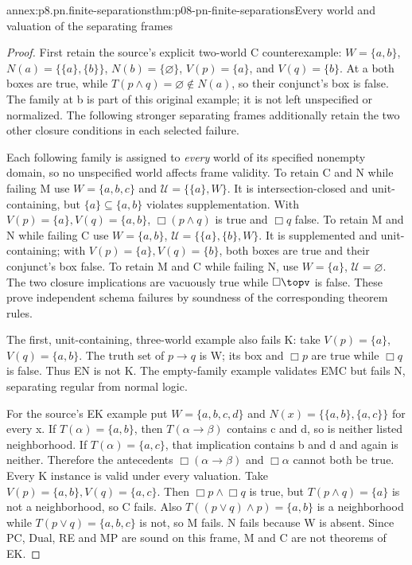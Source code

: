 \begin{annexitem}{annex:p8.pn.finite-separations}{thm:p08-pn-finite-separations}{Every world and valuation of the separating frames}
\begin{proof}
First retain the source's explicit two-world C counterexample:
\(W=\{a,b\}\), \(N(a)=\{\{a\},\{b\}\}\),
\(N(b)=\{\varnothing\}\), \(V(p)=\{a\}\), and
\(V(q)=\{b\}\). At a both boxes are true, while
\(T(p\land q)=\varnothing\notin N(a)\), so their
conjunct's box is false. The family at b is part of this
original example; it is not left unspecified or normalized.
The following stronger separating frames additionally retain
the two other closure conditions in each selected failure.

Each following family is assigned to \emph{every} world of its
specified nonempty domain, so no unspecified world affects frame
validity. To retain C and N while failing M use
\(W=\{a,b,c\}\) and \(\mathcal U=\{\{a\},W\}\).
It is intersection-closed and unit-containing, but
\(\{a\}\subseteq\{a,b\}\) violates supplementation. With
\(V(p)=\{a\},V(q)=\{a,b\}\),
\(\Box(p\land q)\) is true and \(\Box q\) false.
To retain M and N while failing C use
\(W=\{a,b\}\), \(\mathcal U=\{\{a\},\{b\},W\}\).
It is supplemented and unit-containing; with
\(V(p)=\{a\},V(q)=\{b\}\), both boxes are true and
their conjunct's box false. To retain M and C while failing N,
use \(W=\{a\}\), \(\mathcal U=\varnothing\).
The two closure implications are vacuously true while
\(\Box\topv\) is false. These prove independent schema
failures by soundness of the corresponding theorem rules.

The first, unit-containing, three-world example also fails K:
take \(V(p)=\{a\}\), \(V(q)=\{a,b\}\).
The truth set of \(p\to q\) is W; its box and \(\Box p\)
are true while \(\Box q\) is false. Thus EN is not K.
The empty-family example validates EMC but fails N, separating
regular from normal logic.

For the source's EK example put \(W=\{a,b,c,d\}\) and
\(N(x)=\{\{a,b\},\{a,c\}\}\) for every x. If
\(T(\alpha)=\{a,b\}\), then \(T(\alpha\to\beta)\)
contains c and d, so is neither listed neighborhood. If
\(T(\alpha)=\{a,c\}\), that implication contains b and d
and again is neither. Therefore the antecedents
\(\Box(\alpha\to\beta)\) and \(\Box\alpha\) cannot
both be true. Every K instance is valid under every valuation.
Take \(V(p)=\{a,b\},V(q)=\{a,c\}\).
Then \(\Box p\land\Box q\) is true, but
\(T(p\land q)=\{a\}\) is not a neighborhood, so C fails.
Also \(T((p\lor q)\land p)=\{a,b\}\) is a neighborhood
while \(T(p\lor q)=\{a,b,c\}\) is not, so M fails.
N fails because W is absent. Since PC, Dual, RE and MP are
sound on this frame, M and C are not theorems of EK.


\end{proof}
\end{annexitem}
